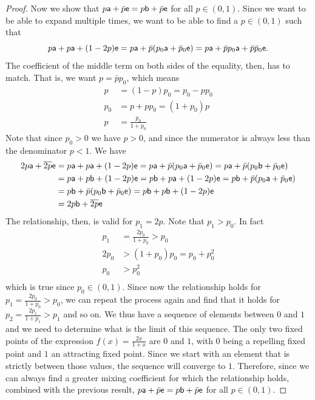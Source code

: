 \begin{mathSection}
\begin{proof}
	Now we show that $p\ens[a] + \bar{p} \ens = p \ens[b] + \bar{p} \ens$ for all $p \in (0,1)$. Since we want to be able to expand multiple times, we want to be able to find a $p \in (0,1)$ such that
	\begin{equation}
		p \ens[a] + p \ens[a] + (1-2p) \ens = p \ens[a] + \bar{p} (p_0 \ens[a] + \bar{p}_0 \ens)= p \ens[a] + \bar{p} p_0 \ens[a] + \bar{p} \bar{p}_0 \ens.
	\end{equation}
	The coefficient of the middle term on both sides of the equality, then, has to match. That is, we want $p = \bar{p} p_0$, which means
	\begin{equation}
		\begin{aligned}
			p&=(1-p)p_0=p_0 - p p_0 \\
			p_0 &= p + p p_0 = (1+p_0) p  \\
			p &= \frac{p_0}{1+p_0}
		\end{aligned}
	\end{equation}
	Note that since $p_0 > 0$ we have $p>0$, and since the numerator is always less than the denominator $p < 1$. We have
	\begin{equation}
		\begin{aligned}
			2p \ens[a] + \overline{2p} \ens &=  p \ens[a] + p \ens[a] + (1-2p) \ens =  p \ens[a] + \bar{p} (p_0 \ens[a] + \bar{p}_0 \ens) = p \ens[a] + \bar{p} (p_0 \ens[b] + \bar{p}_0 \ens) \\
			&= p \ens[a] + p \ens[b] + (1-2p) \ens = p \ens[b] + p \ens[a] + (1-2p) \ens = p \ens[b] + \bar{p} (p_0 \ens[a] + \bar{p}_0 \ens) \\
			&= p \ens[b] + \bar{p} (p_0 \ens[b] + \bar{p}_0 \ens) = p \ens[b] + p \ens[b] + (1-2p) \ens \\
			&= 2p \ens[b] + \overline{2p} \ens
		\end{aligned}
	\end{equation}
	The relationship, then, is valid for $p_1 = 2p$. Note that $p_1 > p_0$. In fact
	\begin{equation}
		\begin{aligned}
			p_1 &= \frac{2p_0}{1+p_0} > p_0  \\
			2 p_0 &> (1+p_0) p_0 = p_0 + p_0^2 \\
			p_0 &> p_0^2 \\
		\end{aligned}
	\end{equation}
	which is true since $p_0 \in (0,1)$. Since now the relationship holds for $p_1 = \frac{2 p_0}{1+p_0} > p_0 $, we can repeat the process again and find that it holds for $p_2 = \frac{2 p_1}{1+p_1} > p_1$ and so on. We thus have a sequence of elements between $0$ and $1$ and we need to determine what is the limit of this sequence. The only two fixed points of the expression $f(x) = \frac{2x}{1+x}$ are $0$ and $1$, with $0$ being a repelling fixed point and $1$ an attracting fixed point. Since we start with an element that is strictly between those values, the sequence will converge to $1$. Therefore, since we can always find a greater mixing coefficient for which the relationship holds, combined with the previous result, $p\ens[a] + \bar{p} \ens = p \ens[b] + \bar{p} \ens$ for all $p \in (0,1)$.
	

\end{proof}
\end{mathSection}
